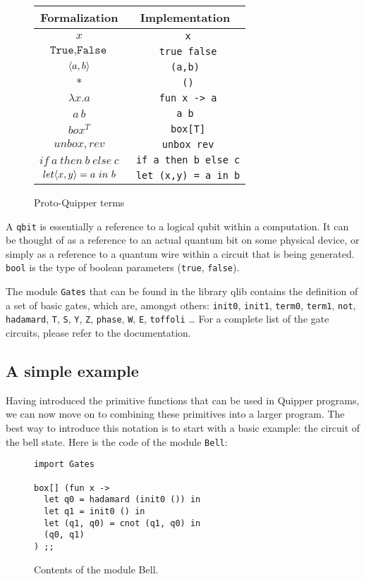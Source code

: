 \begin{figure}[!ht]
\begin{center}
\begin{tabular}{|c|c|}
	\hline
	Formalization & Implementation \\\hline
	$x$ & \verb# x# \\\hline
	$\texttt{True}, \texttt{False}$ & \verb# true false# \\\hline
	$\langle a, b \rangle$ & \verb# (a,b) # \\\hline
	$*$ & \verb# ()# \\\hline
	$\lambda x.a$ & \verb# fun x -> a# \\\hline
	$a \, b$ & \verb#a b# \\\hline
	$box^T$ & \verb# box[T]# \\\hline
	$unbox, rev$ & \verb# unbox rev# \\\hline
	$if ~a~ then ~b~ else ~c$ & \verb# if a then b else c# \\\hline
	$let \langle x, y \rangle = a ~in~ b$ & \verb# let (x,y) = a in b# \\\hline
\end{tabular}
\end{center}
\label{terms}
\caption{Proto-Quipper terms}
\end{figure}

A \verb#qbit# is essentially a reference to a logical qubit within a
computation. It can be thought of as a reference to an actual quantum
bit on some physical device, or simply as a reference to a quantum
wire within a circuit that is being generated. \verb#bool# is the type of boolean parameters
(\verb#true#, \verb#false#).

The module \verb#Gates# that can be found in the library qlib contains the definition of a set of basic gates,
which are, amongst others: \verb#init0#, \verb#init1#, \verb#term0#, \verb#term1#, \verb#not#, \verb#hadamard#, \verb#T#,
\verb#S#, \verb#Y#, \verb#Z#, \verb#phase#, \verb#W#, \verb#E#, \verb#toffoli# \ldots
For a complete list of the gate circuits, please refer to the documentation.

\subsection{A simple example}\label{ssec-quipper-by-e}
Having introduced the primitive functions that can be used in Quipper
programs, we can now move on to combining these primitives into a
larger program. The best way to introduce this notation is to start with a basic example: the circuit of the
bell state. Here is the code of the module \verb#Bell#:
\begin{figure}[!ht]
\begin{verbatim}
import Gates

box[] (fun x ->
  let q0 = hadamard (init0 ()) in
  let q1 = init0 () in
  let (q1, q0) = cnot (q1, q0) in
  (q0, q1)
) ;;
\end{verbatim}
\caption{Contents of the module Bell.}
\end{figure}

